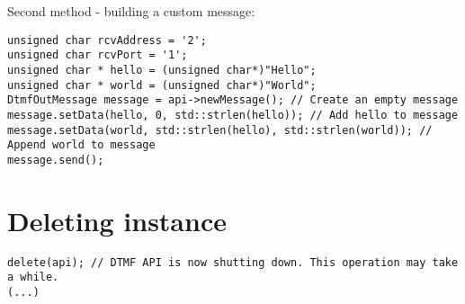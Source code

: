 Second method - building a custom message:
\begin{lstlisting}[float=htb,language={[ANSI]C++},caption={Sending data example 2},label=SendingDataEx2]
unsigned char rcvAddress = '2';
unsigned char rcvPort = '1';
unsigned char * hello = (unsigned char*)"Hello";
unsigned char * world = (unsigned char*)"World";
DtmfOutMessage message = api->newMessage(); // Create an empty message
message.setData(hello, 0, std::strlen(hello)); // Add hello to message
message.setData(world, std::strlen(hello), std::strlen(world)); // Append world to message
message.send();
\end{lstlisting}


\section{Deleting instance}
\begin{lstlisting}[float=htb,language={[ANSI]C++},caption={Deleting instance example},label=DeletingInstanceEx]
delete(api); // DTMF API is now shutting down. This operation may take a while.
(...)
\end{lstlisting}